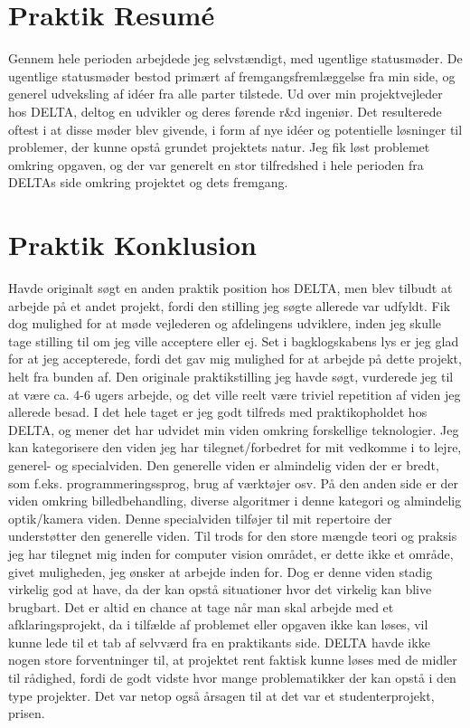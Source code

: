 \section{Praktik Resumé}
Gennem hele perioden arbejdede jeg selvstændigt, med ugentlige statusmøder.
De ugentlige statusmøder bestod primært af fremgangsfremlæggelse fra min side, og generel udveksling af idéer fra alle parter tilstede.
Ud over min projektvejleder hos DELTA, deltog en udvikler og deres førende r\&d ingeniør. Det resulterede oftest i at disse møder blev givende,
i form af nye idéer og potentielle løsninger til problemer, der kunne opstå grundet projektets natur. Jeg fik løst problemet omkring opgaven, og
der var generelt en stor tilfredshed i hele perioden fra DELTAs side omkring projektet og dets fremgang. 


\section{Praktik Konklusion}
Havde originalt søgt en anden praktik position hos DELTA, men blev tilbudt at arbejde på et andet projekt, fordi den stilling jeg søgte allerede
var udfyldt. Fik dog mulighed for at møde vejlederen og afdelingens udviklere, inden jeg skulle tage stilling til om jeg ville acceptere eller ej.
Set i bagklogskabens lys er jeg glad for at jeg accepterede, fordi det gav mig mulighed for at arbejde på dette projekt, helt fra bunden af.
Den originale praktikstilling jeg havde søgt, vurderede jeg til at være ca. 4-6 ugers arbejde, og det ville reelt være triviel repetition af viden jeg
allerede besad.
I det hele taget er jeg godt tilfreds med praktikopholdet hos DELTA, og mener det har udvidet min viden omkring forskellige teknologier.
Jeg kan kategorisere den viden jeg har tilegnet/forbedret for mit vedkomme i to lejre, generel- og specialviden. Den generelle viden er almindelig viden
der er bredt, som f.eks. programmeringssprog, brug af værktøjer osv. På den anden side er der viden omkring billedbehandling, diverse algoritmer i denne kategori
og almindelig optik/kamera viden. Denne specialviden tilføjer til mit repertoire der understøtter den generelle viden.
Til trods for den store mængde teori og praksis jeg har tilegnet mig inden for computer vision området, er dette ikke et område, givet muligheden, jeg ønsker at
arbejde inden for. Dog er denne viden stadig virkelig god at have, da der kan opstå situationer hvor det virkelig kan blive brugbart.
Det er altid en chance at tage når man skal arbejde med et afklaringsprojekt, da i tilfælde af problemet eller opgaven ikke kan løses, vil kunne lede til et tab af selvværd fra
en praktikants side. DELTA havde ikke nogen store forventninger til, at projektet rent faktisk kunne løses med de midler til rådighed, fordi de godt vidste hvor
mange problematikker der kan opstå i den type projekter. Det var netop også årsagen til at det var et studenterprojekt, prisen.


